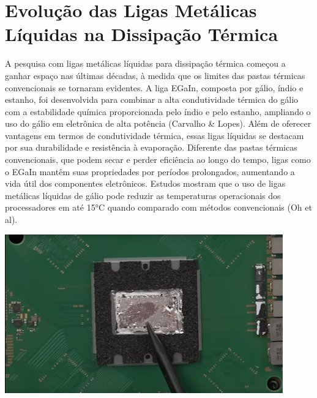 \documentclass[12pt]{article}
\begin{document}
\section{Evolução das Ligas Metálicas Líquidas na Dissipação Térmica}
A pesquisa com ligas metálicas líquidas para dissipação térmica começou a ganhar espaço nas últimas décadas, à medida que os limites das pastas térmicas convencionais se tornaram evidentes. A liga EGaIn, composta por gálio, índio e estanho, foi desenvolvida para combinar a alta condutividade térmica do gálio com a estabilidade química proporcionada pelo índio e pelo estanho, ampliando o uso do gálio em eletrônica de alta potência (Carvalho \& Lopes).
Além de oferecer vantagens em termos de condutividade térmica, essas ligas líquidas se destacam por sua durabilidade e resistência à evaporação. Diferente das pastas térmicas convencionais, que podem secar e perder eficiência ao longo do tempo, ligas como o EGaIn mantêm suas propriedades por períodos prolongados, aumentando a vida útil dos componentes eletrônicos. Estudos mostram que o uso de ligas metálicas líquidas de gálio pode reduzir as temperaturas operacionais dos processadores em até 15°C quando comparado com métodos convencionais (Oh et al).
\begin{adjustbox}{center,caption={Chip que utiliza metal liquido como interface termica},nofloat=figure,vspace=\bigskipamount}
    \centering
    \includegraphics[width=12cm]{chip.png}
\end{adjustbox}
\end{document}

